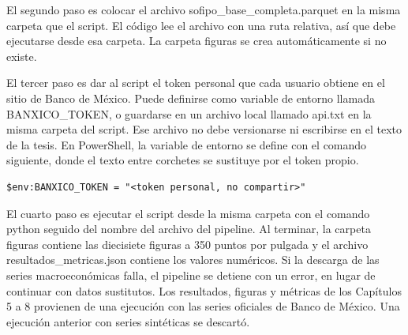 El segundo paso es colocar el archivo sofipo\_base\_completa.parquet en la misma carpeta que el script. El código lee el archivo con una ruta relativa, así que debe ejecutarse desde esa carpeta. La carpeta figuras se crea automáticamente si no existe.

El tercer paso es dar al script el token personal que cada usuario obtiene en el sitio de Banco de México. Puede definirse como variable de entorno llamada BANXICO\_TOKEN, o guardarse en un archivo local llamado api.txt en la misma carpeta del script. Ese archivo no debe versionarse ni escribirse en el texto de la tesis. En PowerShell, la variable de entorno se define con el comando siguiente, donde el texto entre corchetes se sustituye por el token propio.

\begin{lstlisting}[caption={Definición de la variable de entorno con un token personal}, label={lst:met_token}]
$env:BANXICO_TOKEN = "<token personal, no compartir>"
\end{lstlisting}

El cuarto paso es ejecutar el script desde la misma carpeta con el comando python seguido del nombre del archivo del pipeline. Al terminar, la carpeta figuras contiene las diecisiete figuras a 350 puntos por pulgada y el archivo resultados\_metricas.json contiene los valores numéricos. Si la descarga de las series macroeconómicas falla, el pipeline se detiene con un error, en lugar de continuar con datos sustitutos. Los resultados, figuras y métricas de los Capítulos 5 a 8 provienen de una ejecución con las series oficiales de Banco de México. Una ejecución anterior con series sintéticas se descartó.

